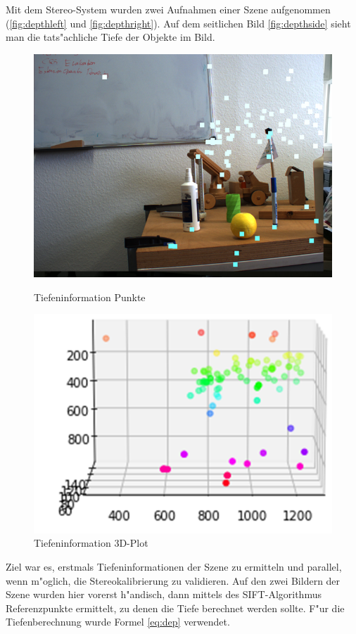 \noindent Mit dem Stereo-System wurden zwei Aufnahmen einer Szene aufgenommen (\ref{fig:depthleft} und \ref{fig:depthright}). Auf dem seitlichen Bild \ref{fig:depthside} sieht man die tats"achliche Tiefe der Objekte im Bild.

\begin{figure}[!htb]
	\includegraphics[width=\linewidth]{bilder/depth_result}
	\caption{Tiefeninformation Punkte}\label{fig:depthpoints}
	\endminipage\hfill
	\includegraphics[width=\linewidth]{bilder/depth_coord}
	\caption{Tiefeninformation 3D-Plot}\label{fig:depthplot}
	\endminipage\hfill
\end{figure}

\noindent Ziel war es, erstmals Tiefeninformationen der Szene zu ermitteln und parallel, wenn m"oglich, die Stereokalibrierung zu validieren. Auf den zwei Bildern der Szene wurden hier vorerst h"andisch, dann mittels des SIFT-Algorithmus Referenzpunkte ermittelt, zu denen die Tiefe berechnet werden sollte.\newline
F"ur die Tiefenberechnung wurde Formel \ref{eq:dep} verwendet.

